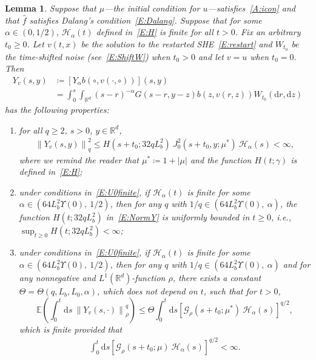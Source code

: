 \documentclass[sn-mathphys]{sn-jnl}%
\renewcommand{\R}{\mathbb{R}}
\newcommand{\E}{\mathbb{E}}
\newcommand{\Norm}[1]{\left\| #1 \right\|}
\newcommand{\ud}{\ensuremath{\mathrm{d}}}
\numberwithin{equation}{section}
\theoremstyle{thmstyleone}%
\newtheorem{lemma}[theorem]{Lemma}
\theoremstyle{thmstyletwo}%
\theoremstyle{thmstylethree}%
\begin{document}
\begin{lemma}\label{L:yineq}
  Suppose that $\mu$---the initial condition for $u$---satisfies~\eqref{A:icon} and that
  $\widehat{f}$ satisfies Dalang's condition~\eqref{E:Dalang}. Suppose that for some $\alpha\in
  (0,1/2)$, $\mathcal{H}_\alpha(t)$ defined in~\eqref{E:H} is finite for all $t>0$. Fix an arbitrary
  $t_0\ge 0$. Let $v(t,x)$ be the solution to the restarted SHE~\eqref{E:restart} and
  $\dot{W}_{t_0}$ be the time-shifted noise (see~\eqref{E:ShiftW}) when $t_0>0$ and let $v = u$ when
  $t_0 = 0$. Then
  \begin{equation}\label{E:Y}
    \begin{aligned}
      Y_v(s,y) & \coloneqq \left[Y_\alpha b\left(\circ, v(\cdot,\circ)\right)\right](s,y) \\
               & = \int_0^s \int_{\R^d} (s-r)^{-\alpha}G(s-r,y-z)b(z,v(r,z))W_{t_0}(\ud r,\ud z)
    \end{aligned}
  \end{equation}
  has the following properties:
  \begin{enumerate}[(1)]
    \item for all $q\ge 2$, $s>0$, $y\in\R^d$,
      \begin{align}\label{E:NormY}
        \Norm{Y_v(s,y)}_q^2 \le H\left(s+t_0;32qL_b^2\right) \: J_0^2 (s + t_0,y;\mu^*)\: \mathcal{H}_\alpha(s)<\infty,
      \end{align}
      where we remind the reader that $\mu^* \coloneqq 1 + \lvert\mu\rvert$ and the function
      $H\left(t;\gamma\right)$ is defined in~\eqref{E:H};
    \item under conditions in~\eqref{E:U0finite}, if $\mathcal{H}_\alpha(t)$ is finite for some
      $\alpha\in \left(64 L_b^2 \Upsilon(0),\: 1/2\right)$, then for any $q$ with $1/q\in \left(64
      L_b^2 \Upsilon(0), \: \alpha\right)$, the function $H\left(t;32qL_b^2\right)$
      in~\eqref{E:NormY} is uniformly bounded in $t\ge 0$, i.e., $\sup_{t\ge
      0}H\left(t;32qL_b^2\right)<\infty$;
    \item under conditions in~\eqref{E:U0finite}, if $\mathcal{H}_\alpha(t)$ is finite for some
      $\alpha\in \left(64 L_b^2 \Upsilon(0),\: 1/2\right)$, then for any $q$ with $1/q\in \left(64
      L_b^2 \Upsilon(0), \: \alpha\right)$ and for any nonnegative and $L^1 (\R^d)$-function $\rho$,
      there exists a constant $\Theta = \Theta\left(q,L_b,L_0,\alpha\right)$, which does not depend
      on $t$, such that for $t>0$,
      \begin{equation}\label{E:yineq}
        \E \left(\int_0^{t}\ud s\: \Norm{Y_v(s,\cdot)}_{\rho}^q \right)
        \le \Theta \int_0^t \ud s \left[\mathcal{G}_{\rho}(s + t_0;\mu^*)\: \mathcal{H}_\alpha(s)\right]^{q/2},
      \end{equation}
      which is finite provided that
    \begin{align}\label{E:GH-int'}
      \int_{0}^t \ud s \left[\mathcal{G}_{\rho}(s + t_0;\mu)\:\mathcal{H}_\alpha(s)\right]^{q/2} <\infty.
    \end{align}
  \end{enumerate}
\end{lemma}
\end{document}

